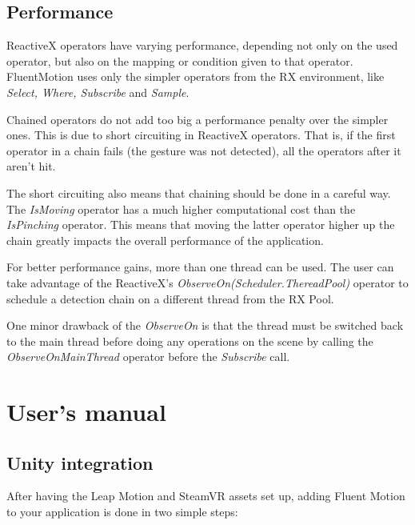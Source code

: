 \documentclass[12pt,a4paper,twoside]{report}
\begin{document}
\section{Performance}

ReactiveX operators have varying performance, depending not only on the used operator, but also on the mapping or condition given to that operator. FluentMotion uses only the simpler operators from the RX environment, like \textit{Select, Where, Subscribe} and \textit{Sample}.

Chained operators do not add too big a performance penalty over the simpler ones. This is due to short circuiting in ReactiveX operators. That is, if the first operator in a chain fails (the gesture was not detected), all the operators after it aren't hit.

The short circuiting also means that chaining should be done in a careful way. The \textit{IsMoving} operator has a much higher computational cost than the \textit{IsPinching} operator. This means that moving the latter operator higher up the chain greatly impacts the overall performance of the application.

For better performance gains, more than one thread can be used. The user can take advantage of the ReactiveX's \textit{ObserveOn(Scheduler.ThereadPool)} operator to schedule a detection chain on a different thread from the RX Pool. 

One minor drawback of the \textit{ObserveOn} is that the thread must be switched back to the main thread before doing any operations on the scene by calling the \textit{ObserveOnMainThread} operator before the \textit{Subscribe} call.

\chapter{User's manual}

\section{Unity integration}
After having the Leap Motion and SteamVR assets set up, adding Fluent Motion to your application is done in two simple steps:
\end{document}
